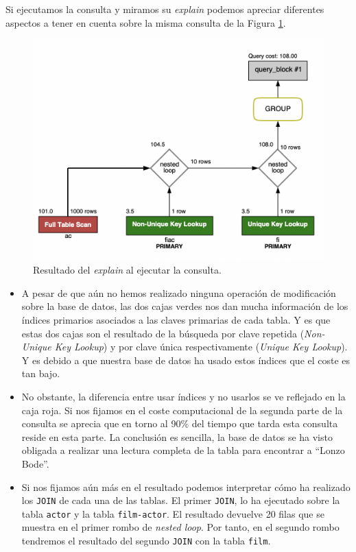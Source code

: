 \documentclass{db-practice}
\begin{document}
Si ejecutamos la consulta y miramos su \emph{explain} podemos apreciar diferentes aspectos a tener en cuenta sobre la misma consulta de la Figura \ref{fig:ejecucion1}.

\begin{figure}[ht]
    \centering
    \includegraphics[width=0.8\columnwidth]{figs/ejecucion1.png}
    \caption{Resultado del \emph{explain} al ejecutar la consulta.}\label{fig:ejecucion1}
\end{figure}

\begin{itemize}
    \item A pesar de que aún no hemos realizado ninguna operación de modificación sobre la base de datos, las dos cajas verdes nos dan mucha información de los índices primarios asociados a las claves primarias de cada tabla. Y es que estas dos cajas son el resultado de la búsqueda por clave repetida (\emph{Non-Unique Key Lookup}) y por clave única respectivamente (\emph{Unique Key Lookup}). Y es debido a que nuestra base de datos ha usado estos índices que el coste es tan bajo.
    \item No obstante, la diferencia entre usar índices y no usarlos se ve reflejado en la caja roja. Si nos fijamos en el coste computacional de la segunda parte de la consulta se aprecia que en torno al 90\% del tiempo que tarda esta consulta reside en esta parte. La conclusión es sencilla, la base de datos se ha visto obligada a realizar una lectura completa de la tabla para encontrar a ``Lonzo Bode''.
    \item Si nos fijamos aún más en el resultado podemos interpretar cómo ha realizado los \texttt{JOIN} de cada una de las tablas. El primer \texttt{JOIN}, lo ha ejecutado sobre la tabla \texttt{actor} y la tabla \texttt{film-actor}. El resultado devuelve 20 filas que se muestra en el primer rombo de \emph{nested loop}. Por tanto, en el segundo rombo tendremos el resultado del segundo  \texttt{JOIN} con la tabla \texttt{film}.
\end{itemize}
\end{document}
